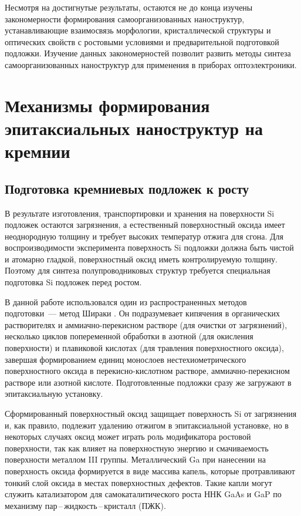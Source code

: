 Несмотря на достигнутые результаты, остаются не до конца изучены закономерности формирования самоорганизованных наноструктур, устанавливающие взаимосвязь морфологии, кристаллической структуры и оптических свойств с ростовыми условиями и предварительной подготовкой подложки. Изучение данных закономерностей позволит развить методы синтеза самоорганизованных наноструктур для применения в приборах оптоэлектроники.

\section{Механизмы формирования эпитаксиальных наноструктур на кремнии}\label{sec:ch1/sec2}

\subsection{Подготовка кремниевых подложек к росту}\label{subsec:ch1/sec2/sub1}

В результате изготовления, транспортировки и хранения на поверхности Si подложек остаются загрязнения, а естественный поверхностный оксида имеет неоднородную толщину и требует высоких температур отжига для сгона. Для воспроизводимости эксперимента поверхность Si подложки должна быть чистой и атомарно гладкой, поверхностный оксид иметь контролируемую толщину. Поэтому для синтеза полупроводниковых структур требуется специальная подготовка Si подложек перед ростом.

В данной работе использовался один из распространенных методов подготовки~--- метод Шираки \cite{Ishizaka2019}. Он подразумевает кипячения в органических растворителях и аммиачно-перекисном растворе (для очистки от загрязнений), несколько циклов попеременной обработки в азотной (для окисления поверхности) и плавиковой кислотах (для травления поверхностного оксида), завершая формированием единиц монослоев нестехиометрического поверхностного оксида в перекисно-кислотном растворе, аммиачно-перекисном растворе или азотной кислоте. Подготовленные подложки сразу же загружают в эпитаксиальную установку.

Сформированный поверхностный оксид защищает поверхность Si от загрязнения и, как правило, подлежит удалению отжигом в эпитаксиальной установке, но в некоторых случаях оксид может играть роль модификатора ростовой поверхности, так как влияет на поверхностную энергию и смачиваемость поверхности металлом III группы. Металлический Ga при нанесении на поверхность оксида формируется в виде массива капель, которые протравливают тонкий слой оксида в местах поверхностных дефектов. Такие капли могут служить катализатором для самокаталитического роста ННК GaAs и GaP по механизму пар\,--\,жидкость\,--\,кристалл (ПЖК).

